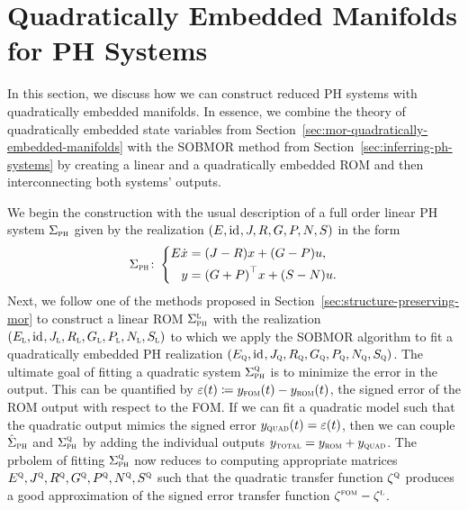 \section{Quadratically Embedded Manifolds for \texorpdfstring{\ac{PH}}{PH} Systems}\label{sec:quadratically-embedded-manifolds-ph-systems}

In this section, we discuss how we can construct reduced \ac{PH} systems with quadratically embedded manifolds.
In essence, we combine the theory of quadratically embedded state variables from Section~\ref{sec:mor-quadratically-embedded-manifolds} with the \ac{SOBMOR} method from Section~\ref{sec:inferring-ph-systems} by creating a linear and a quadratically embedded \ac{ROM} and then interconnecting both systems' outputs.

We begin the construction with the usual description of a full order linear \ac{PH} system $\Sigma_{\textnormal{\scshape ph}}$ given by the realization $(E, \text{id}_{}, J, R, G, P, N, S)$ in the form
\begin{equation*}
    \Sigma_{\textnormal{\scshape ph}} \colon \left\lbrace
    \begin{aligned}
        E \dot{x} &= (J - R) x + (G - P) u, \\
        y &= {(G + P)}^{\top} x + (S - N) u.
    \end{aligned}
    \right.
\end{equation*}
Next, we follow one of the methods proposed in Section~\ref{sec:structure-preserving-mor} to construct a linear \ac{ROM} $\Sigma_{\textnormal{\scshape ph}}^{\textnormal{\scshape l}}$ with the realization $(E_{\textnormal{\scshape l}}, \text{id}_{}, J_{\textnormal{\scshape l}}, R_{\textnormal{\scshape l}}, G_{\textnormal{\scshape l}}, P_{\textnormal{\scshape l}}, N_{\textnormal{\scshape l}}, S_{\textnormal{\scshape l}})$ to which we apply the \ac{SOBMOR} algorithm to fit a quadratically embedded \ac{PH} realization $(E_{\textnormal{\scshape q}}, \text{id}_{}, J_{\textnormal{\scshape q}}, R_{\textnormal{\scshape q}}, G_{\textnormal{\scshape q}}, P_{\textnormal{\scshape q}}, N_{\textnormal{\scshape q}}, S_{\textnormal{\scshape q}})$.
The ultimate goal of fitting a quadratic system $\Sigma_{\textnormal{\scshape ph}}^{\textnormal{\scshape q}}$ is to minimize the error in the output.
This can be quantified by $\varepsilon(t) \coloneqq y_{\textnormal{\scshape fom}}(t) - y_{\textnormal{\scshape rom}}(t)$, the signed error of the \ac{ROM} output with respect to the \ac{FOM}.
If we can fit a quadratic model such that the quadratic output mimics the signed error $y_{\textnormal{\scshape quad}}(t) = \varepsilon(t)$, then we can couple $\hat{\Sigma}_{\textnormal{\scshape ph}}$ and $\Sigma_{\textnormal{\scshape ph}}^{\textnormal{\scshape q}}$ by adding the individual outputs $y_{\textnormal{\scshape total}} = y_{\textnormal{\scshape rom}} + y_{\textnormal{\scshape quad}}$.
The prbolem of fitting $\Sigma_{\textnormal{\scshape ph}}^{\textnormal{\scshape q}}$ now reduces to computing appropriate matrices $E^{\textnormal{\scshape q}}, J^{\textnormal{\scshape q}}, R^{\textnormal{\scshape q}}, G^{\textnormal{\scshape q}}, P^{\textnormal{\scshape q}}, N^{\textnormal{\scshape q}}, S^{\textnormal{\scshape q}}$ such that the quadratic transfer function $\zeta^{\textnormal{\scshape q}}$ produces a good approximation of the signed error transfer function $\zeta^{\textnormal{\scshape fom}} - \zeta^{\textnormal{\scshape l}}$.
